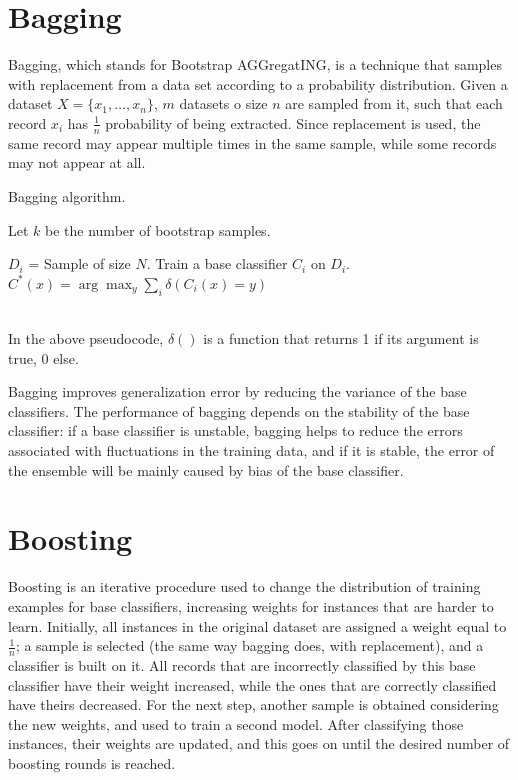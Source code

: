\section{Bagging}

Bagging, which stands for Bootstrap AGGregatING, is a technique that samples with replacement from a data set according to a probability distribution. Given a dataset $X = \{x_1, \dots, x_n \}$, $m$ datasets o size $n$ are sampled from it, such that each record $x_i$ has $\frac{1}{n}$ probability of being extracted. Since replacement is used, the same record may appear multiple times in the same sample, while some records may not appear at all.
\begin{algorithm}
\caption{Bagging algorithm.}
\begin{algorithmic}[1]
    \State Let $k$ be the number of bootstrap samples.

        \State $D_i$ = Sample of size $N$.
        \State Train a base classifier $C_i$ on $D_i$.
    \EndFor
    \State $C^*(x) = \arg\max_y \sum_i \delta(C_i(x) = y)$
\end{algorithmic}
\end{algorithm} \\
In the above pseudocode, $\delta()$ is a function that returns 1 if its argument is true, 0 else.

Bagging improves generalization error by reducing the variance of the base classifiers. The performance of bagging depends on the stability of the base classifier: if a base classifier is unstable, bagging helps to reduce the errors associated with fluctuations in the training data, and if it is stable, the error of the ensemble will be mainly caused by bias of the base classifier.

\section{Boosting}

Boosting is an iterative procedure used to change the distribution of training examples for base classifiers, increasing weights for instances that are harder to learn. Initially, all instances in the original dataset are assigned a weight equal to $\frac{1}{n}$; a sample is selected (the same way bagging does, with replacement), and a classifier is built on it. All records that are incorrectly classified by this base classifier have their weight increased, while the ones that are correctly classified have theirs decreased. For the next step, another sample is obtained considering the new weights, and used to train a second model. After classifying those instances, their weights are updated, and this goes on until the desired number of boosting rounds is reached.

